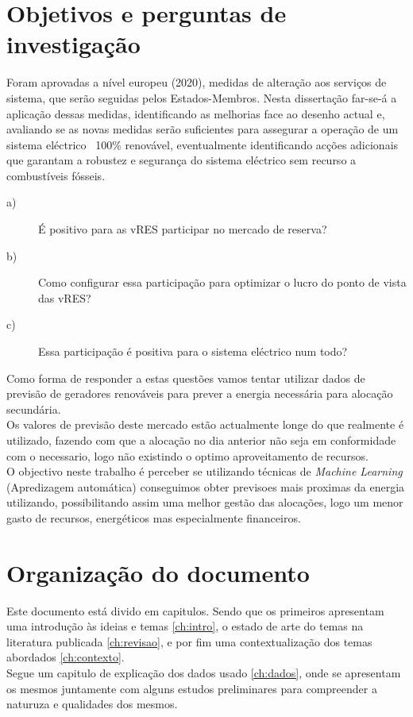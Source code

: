 \section{Objetivos e perguntas de investigação \label{se:objetivos}}

Foram aprovadas a nível europeu (2020), medidas de alteração aos serviços de sistema, que serão seguidas pelos Estados-Membros. Nesta dissertação far-se-á a aplicação dessas medidas, identificando as melhorias face ao desenho actual e, avaliando se as novas medidas serão suficientes para assegurar a operação de um sistema eléctrico ~100\% renovável, eventualmente identificando acções adicionais que garantam a robustez e segurança do sistema eléctrico sem recurso a combustíveis fósseis.\\

\begin{description}
  \item[a)]\noindent É positivo para as vRES participar no mercado de reserva?
  \item[b)]\noindent Como configurar essa participação para optimizar o lucro do ponto de vista das vRES?
  \item[c)]\noindent Essa participação é positiva para o sistema eléctrico num todo?
\end{description}

Como forma de responder a estas questões vamos tentar utilizar dados de previsão de geradores renováveis para prever a energia necessária para alocação secundária.\\
Os valores de previsão deste mercado estão actualmente longe do que realmente é utilizado, fazendo com que a alocação no dia anterior não seja em conformidade com o necessario, logo não existindo o optimo aproveitamento de recursos. \\
O objectivo neste trabalho é perceber se utilizando técnicas de \textit{Machine Learning} (Apredizagem automática) %
conseguimos obter previsoes mais proximas da energia utilizando, possibilitando assim uma melhor gestão das alocações, logo um menor gasto de recursos, energéticos mas especialmente financeiros.\\

\section{Organização do documento \label{se:organização}}

Este documento está divido em capitulos. Sendo que os primeiros apresentam uma introdução às ideias e temas \ref{ch:intro}, o estado de arte do temas na literatura publicada \ref{ch:revisao}, e por fim uma contextualização dos temas abordados \ref{ch:contexto}. \\
Segue um capitulo de explicação dos dados usado \ref{ch:dados}, onde se apresentam os mesmos juntamente com alguns estudos preliminares para compreender a naturuza e qualidades dos mesmos. \\%

